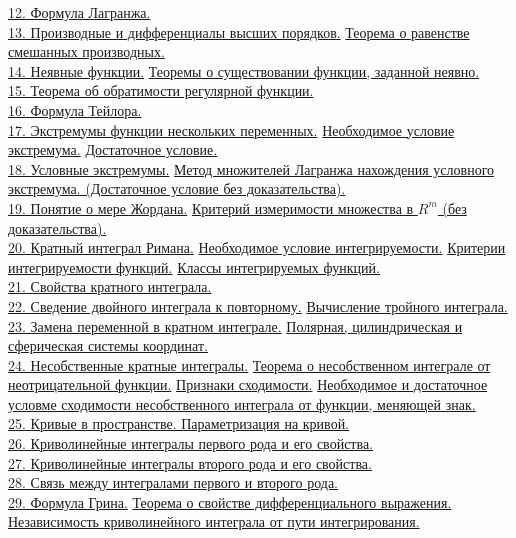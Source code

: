 \documentclass[12pt]{article}
\begin{document}
\hyperref[question12]{12.	Формула Лагранжа.}\\
\hyperref[question13_1]{13.	Производные и дифференциалы высших порядков.} \hyperref[question13_2]{Теорема о равенстве смешанных производных.}\\
\hyperref[question14_1]{14.	Неявные функции.} \hyperref[question14_2]{Теоремы о существовании функции, заданной неявно.}\\
\hyperref[question15]{15.	Теорема об обратимости регулярной функции.}\\
\hyperref[question16]{16.	Формула Тейлора.}\\
\hyperref[question17_1]{17.	Экстремумы функции нескольких переменных.} \hyperref[question17_2]{Необходимое условие экстремума.} \hyperref[question17_3]{Достаточное условие.}\\
\hyperref[question18_1]{18.	Условные экстремумы.} \hyperref[question18_2]{Метод множителей Лагранжа нахождения условного экстремума. (Достаточное условие без доказательства).}\\
\hyperref[question19_1]{19.	Понятие о мере Жордана.} \hyperref[question19_2]{Критерий измеримости множества в $R^m$ (без доказательства).}\\
\hyperref[question20_1]{20.	Кратный интеграл Римана.} \hyperref[question20_2]{Необходимое условие интегрируемости.} \hyperref[question20_3]{Критерии интегрируемости функций.} \hyperref[question20_4]{Классы интегрируемых функций.}\\
\hyperref[question21]{21.	Свойства кратного интеграла.}\\
\hyperref[question22_1]{22.	Сведение двойного интеграла к повторному.} \hyperref[question22_2]{Вычисление тройного интеграла.}\\
\hyperref[question23_1]{23.	Замена переменной в кратном интеграле.} \hyperref[question23_2]{Полярная, цилиндрическая и сферическая системы координат.}\\
\hyperref[question24_1]{24.	Несобственные кратные интегралы.} \hyperref[question24_2]{Теорема о несобственном интеграле от неотрицательной функции.} \hyperref[question24_3]{ Признаки сходимости.} \hyperref[question24_4]{Необходимое и достаточное условме сходимости несобственного интеграла от функции, меняющей знак.}\\
\hyperref[question25]{25.	Кривые в пространстве. Параметризация на кривой.}\\
\hyperref[question26]{26.	Криволинейные интегралы первого рода и его свойства.}\\
\hyperref[question27]{27.	Криволинейные интегралы второго рода и его свойства.}\\
\hyperref[question28]{28.	Связь между интегралами первого и второго рода.}\\
\hyperref[question29_1]{29.	Формула Грина.} \hyperref[question29_2]{Теорема о свойстве дифференциального выражения.} \hyperref[question29_3]{Независимость криволинейного интеграла от пути интегрирования.}\\
\end{document}
